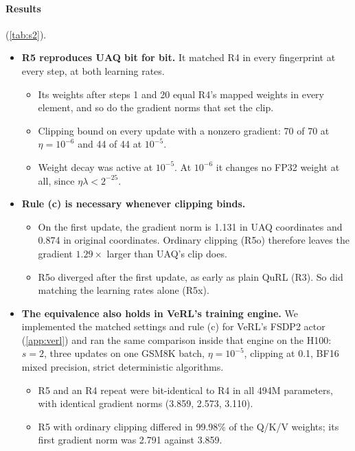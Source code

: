 \paragraph{Results} (\cref{tab:s2}).
\begin{itemize}[leftmargin=*,itemsep=2pt]
\item \textbf{R5 reproduces UAQ bit for bit.} It matched R4 in every fingerprint at every step, at both learning rates.
  \begin{itemize}[leftmargin=*,itemsep=1pt]
  \item Its weights after steps 1 and 20 equal R4's mapped weights in every element, and so do the gradient norms that set the clip.
  \item Clipping bound on every update with a nonzero gradient: 70 of 70 at $\eta=10^{-6}$ and 44 of 44 at $10^{-5}$.
  \item Weight decay was active at $10^{-5}$. At $10^{-6}$ it changes no FP32 weight at all, since $\eta\lambda<2^{-25}$.
  \end{itemize}
\item \textbf{Rule (c) is necessary whenever clipping binds.}
  \begin{itemize}[leftmargin=*,itemsep=1pt]
  \item On the first update, the gradient norm is 1.131 in UAQ coordinates and 0.874 in original coordinates. Ordinary clipping (R5o) therefore leaves the gradient $1.29\times$ larger than UAQ's clip does.
  \item R5o diverged after the first update, as early as plain QuRL (R3). So did matching the learning rates alone (R5x).
  \end{itemize}
\item \textbf{The equivalence also holds in VeRL's training engine.} We implemented the matched settings and rule (c) for VeRL's FSDP2 actor (\cref{app:verl}) and ran the same comparison inside that engine on the H100: $s=2$, three updates on one GSM8K batch, $\eta=10^{-5}$, clipping at 0.1, BF16 mixed precision, strict deterministic algorithms.
  \begin{itemize}[leftmargin=*,itemsep=1pt]
  \item R5 and an R4 repeat were bit-identical to R4 in all 494M parameters, with identical gradient norms (3.859, 2.573, 3.110).
  \item R5 with ordinary clipping differed in 99.98\% of the Q/K/V weights; its first gradient norm was 2.791 against 3.859.
  \end{itemize}
\end{itemize}

